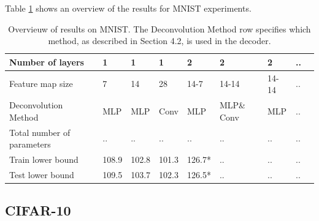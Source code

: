 Table \ref{overview} shows an overview of the results for MNIST experiments. 
\begin{table}
\caption{Overvieuw of results on MNIST. The Deconvolution Method row specifies which method, as described in Section 4.2, is used in the decoder.}
\renewcommand{\arraystretch}{1.5}
\label{overview}
\begin{tabular}{| l | l | l | l | l | l | l | l | l |}

	\hline
  Number of layers 					& 1 	 	& 1 		& 1 		& 2 		& 2 			& 2 		& .. \\ \hline
  Feature map size 					& 7 		& 14 	& 28 	& 14-7	& 14-14		& 14-14 	& .. \\ \hline
  Deconvolution Method 				& MLP 	& MLP	& Conv 	& MLP	& MLP\& Conv	& MLP	& ..	 \\ \hline
  Total number of parameters 		& .. 	& .. 	& ..		& ..		& ..			& .. 	& .. \\ \hline
  Train lower bound 					& 108.9 	& 102.8 	& 101.3 	& 126.7*	& ..			& ..		& .. \\ \hline
  Test lower bound 					& 109.5	& 103.7 	& 102.3 	& 126.5*	& ..			& ..		& .. \\ \hline
\end{tabular}
\end{table}


\subsection{CIFAR-10}






